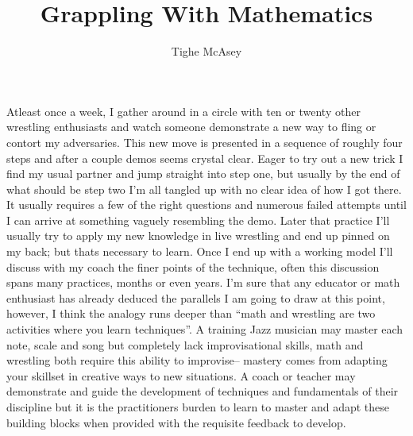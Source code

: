 \documentclass[10.5pt]{article}
\title{Grappling With Mathematics}
\author{Tighe McAsey}
\date{}
\begin{document}
    \maketitle

    Atleast once a week, I gather around in a circle with ten or twenty other wrestling enthusiasts and watch someone demonstrate a new way to fling or contort my adversaries. This new move is presented in a sequence of roughly four steps and after a couple demos seems crystal clear. Eager to try out a new trick I find my usual partner and jump straight into step one, but usually by the end of what should be step two I'm all tangled up with no clear idea of how I got there. It usually requires a few of the right questions and numerous failed attempts until I can arrive at something vaguely resembling the demo. Later that practice I'll usually try to apply my new knowledge in live wrestling and end up pinned on my back; but thats necessary to learn. Once I end up with a working model I'll discuss with my coach the finer points of the technique, often this discussion spans many practices, months or even years. I'm sure that any educator or math enthusiast has already deduced the parallels I am going to draw at this point, however, I think the analogy runs deeper than ``math and wrestling are two activities where you learn techniques''. A training Jazz musician may master each note, scale and song but completely lack improvisational skills, math and wrestling both require this ability to improvise-- mastery comes from adapting your skillset in creative ways to new situations. A coach or teacher may demonstrate and guide the development of techniques and fundamentals of their discipline but it is the practitioners burden to learn to master and adapt these building blocks when provided with the requisite feedback to develop.

    
\end{document}
